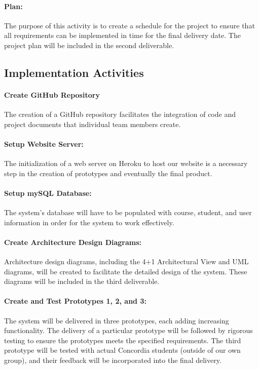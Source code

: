 \documentclass[12pt]{article}
\begin{document}
\paragraph*{Plan:}The purpose of this activity is to create a schedule for the project to ensure that all requirements can be implemented in time for the final delivery date. The project plan will be included in the second deliverable.

\subsection*{Implementation Activities}
\paragraph*{Create GitHub Repository}The creation of a GitHub repository facilitates the integration of code and project documents that individual team members create.

\paragraph*{Setup Website Server:}The initialization of a web server on Heroku to host our website is a necessary step in the creation of prototypes and eventually the final product.

\paragraph*{Setup mySQL Database:}The system's database will have to be populated with course, student, and user information in order for the system to work effectively.

\paragraph*{Create Architecture Design Diagrams:}Architecture design diagrams, including the 4+1 Architectural View and UML diagrams, will be created to facilitate the detailed design of the system. These diagrams will be included in the third deliverable.

\paragraph*{Create and Test Prototypes 1, 2, and 3:}The system will be delivered in three prototypes, each adding increasing functionality. The delivery of a particular prototype will be followed by rigorous testing to ensure the prototypes meets the specified requirements. The third prototype will be tested with actual Concordia students (outside of our own group), and their feedback will be incorporated into the final delivery.
\end{document}
